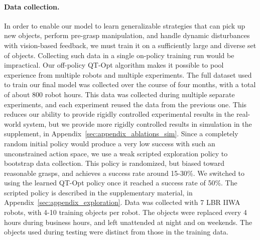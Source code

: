 \documentclass{article}
\begin{document}
\vspace{-0.1in}
\paragraph{Data collection.}
In order to enable our model to learn generalizable strategies that can pick up new objects, perform pre-grasp manipulation, and handle dynamic disturbances with vision-based feedback, we must train it on a sufficiently large and diverse set of objects. Collecting such data in a single on-policy training run would be impractical. Our off-policy QT-Opt algorithm makes it possible to pool experience from multiple robots and multiple experiments. The full dataset used to train our final model was collected over the course of four months, with a total of about 800 robot hours. This data was collected during multiple separate experiments, and each experiment reused the data from the previous one. This reduces our ability to provide rigidly controlled experimental results in the real-world system, but we provide more rigidly controlled results in simulation in the supplement, in Appendix~\ref{sec:appendix_ablations_sim}.
Since a completely random initial policy would produce a very low success with such an unconstrained action space, we use a weak scripted exploration policy to bootstrap data collection. This policy is randomized, but biased toward reasonable grasps, and achieves a success rate around 15-30\%. We switched to using the learned QT-Opt policy once it reached a success rate of 50\%. The scripted policy is described in the supplementary material, in Appendix~\ref{sec:appendix_exploration}.
Data was collected with 7 LBR IIWA robots, with 4-10 training objects per robot. The objects were replaced every 4 hours during business hours, and left unattended at night and on weekends. The objects used during testing were distinct from those in the training data.

\iffalse

\begin{algorithm}[h]{\small
	\caption{Large scale data collection and training on real robots}
	\label{alg:servo}
	\begin{algorithmic}[1]
		\STATE Allocate persistent dataset \(D_{e2e}=\emptyset\).
	    \FOR{$i < num\_experiments$}
		\STATE Keep replaying data from \(D_{e2e}\) to the \(off\_policy\) Replay Buffer.
		\STATE Keep training the model concurrently utilizing distributed RL infrastructure and data pulled from \(on\_policy\) and \(off\_policy\) Replay Buffers.
		\FOR{$j < num\_grasps\_per\_experiment$}
            \STATE Pick \(p_{scripted}\) with probability \(p\) or \(p_{noisy}\) with probability \(1-p\) to generate an episode \(E\).
            \STATE Push episode \(E\) to the \(on\_policy\) Replay Buffer.
            \STATE Append episode \(E\) to \(D_{e2e}\) and save to disk.
            \STATE Update \(p_{noisy}\) model every \(N\) steps.
        \ENDFOR
		\ENDFOR
	\end{algorithmic}
}
\end{algorithm}
\fi
\end{document}
